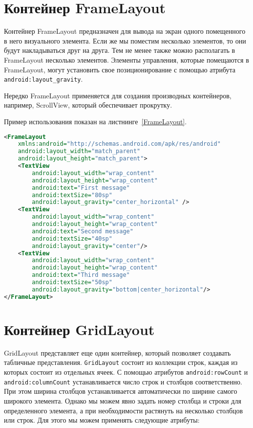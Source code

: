 \section{Контейнер FrameLayout}
Контейнер FrameLayout предназначен для вывода на экран одного 
помещенного в него визуального элемента. Если же мы поместим несколько 
элементов, то они будут накладываться друг на друга. Тем не менее также 
можно располагать в FrameLayout несколько элементов. Элементы 
управления, которые помещаются в FrameLayout, могут установить свое 
позиционирование с помощью атрибута \texttt{android:layout\_gravity}.\par
Нередко FrameLayout применяется для создания производных контейнеров,
например, ScrollView, который обеспечивает прокрутку.

Пример использования показан на листнинге~\ref{FrameLayout}.

\begin{lstlisting}[language=XML
	, caption=\leftline{Программное создание FrameLayout}
	, label=FrameLayout
	]
<FrameLayout
    xmlns:android="http://schemas.android.com/apk/res/android"
    android:layout_width="match_parent"
    android:layout_height="match_parent">
    <TextView
        android:layout_width="wrap_content"
        android:layout_height="wrap_content"
        android:text="First message"
        android:textSize="80sp"
        android:layout_gravity="center_horizontal" />
    <TextView
        android:layout_width="wrap_content"
        android:layout_height="wrap_content"
        android:text="Second message"
        android:textSize="40sp"
        android:layout_gravity="center"/>
    <TextView
        android:layout_width="wrap_content"
        android:layout_height="wrap_content"
        android:text="Third message"
        android:textSize="50sp"
        android:layout_gravity="bottom|center_horizontal"/>
</FrameLayout>
\end{lstlisting}

\section{Контейнер GridLayout}
GridLayout представляет еще один контейнер, который позволяет 
создавать табличные представления. \texttt{GridLayout} состоит из коллекции
строк, каждая из которых состоит из отдельных ячеек. С помощью атрибутов 
\texttt{android:rowCount} и \texttt{android:columnCount} устанавливается
число строк и столбцов соответственно. При этом ширина столбцов
устанавливается автоматически по ширине самого широкого элемента. 
Однако мы можем явно задать номер столбца и строки для 
определенного элемента, а при необходимости растянуть на несколько 
столбцов или строк. Для этого мы можем применять следующие атрибуты:

